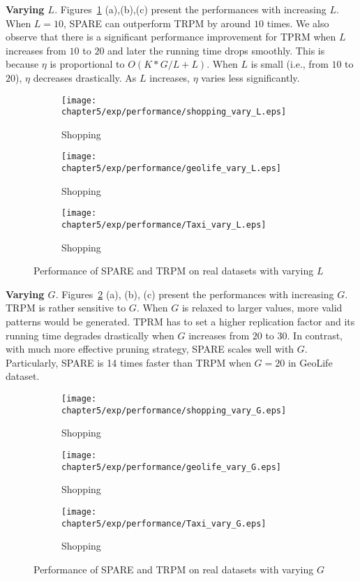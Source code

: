 \textbf{Varying $L$}. Figures~\ref{exp:performance_vary_l} (a),(b),(c) present the performances with increasing $L$. When $L=10$, SPARE can outperform TRPM by around $10$ times. We also observe that there is a significant performance improvement for TPRM when $L$ increases from $10$ to $20$ and later the running time drops smoothly. 
This is because $\eta$ is proportional to $O(K*G/L+L)$. When $L$ is small (i.e., from $10$ to $20$),
$\eta$ decreases drastically. As $L$ increases, $\eta$ varies less significantly.

\begin{figure}[h]
\centering
    \begin{subfigure}[b]{0.3\textwidth}
        \texttt{[image: chapter5/exp/performance/shopping\_vary\_L.eps]}
	     \caption{Shopping}	
    \end{subfigure}
    \begin{subfigure}[b]{0.3\textwidth}
        \texttt{[image: chapter5/exp/performance/geolife\_vary\_L.eps]}
	     \caption{Shopping}	
    \end{subfigure}
    \begin{subfigure}[b]{0.3\textwidth}
        \texttt{[image: chapter5/exp/performance/Taxi\_vary\_L.eps]}
	     \caption{Shopping}	
    \end{subfigure}
\caption{Performance of SPARE and TRPM on real datasets with varying $L$}
\label{exp:performance_vary_l}
\end{figure}


\textbf{Varying $G$}. Figures~\ref{exp:performance_vary_g} (a), (b), (c) present the performances with increasing $G$.  TRPM is rather sensitive to $G$. When $G$ is relaxed to larger values, more valid patterns would be generated. TPRM has to set a higher replication factor and its running time degrades drastically when $G$ increases from $20$ to $30$. In contrast, with much more effective pruning strategy, SPARE scales well with $G$. Particularly, SPARE is 14 times faster than TRPM when $G=20$ in GeoLife dataset.

\begin{figure}[h]
\centering
    \begin{subfigure}[b]{0.3\textwidth}
        \texttt{[image: chapter5/exp/performance/shopping\_vary\_G.eps]}
	     \caption{Shopping}	
    \end{subfigure}
    \begin{subfigure}[b]{0.3\textwidth}
        \texttt{[image: chapter5/exp/performance/geolife\_vary\_G.eps]}
	     \caption{Shopping}	
    \end{subfigure}
    \begin{subfigure}[b]{0.3\textwidth}
        \texttt{[image: chapter5/exp/performance/Taxi\_vary\_G.eps]}
	     \caption{Shopping}	
    \end{subfigure}
\caption{Performance of SPARE and TRPM on real datasets with varying $G$}
\label{exp:performance_vary_g}
\end{figure}


